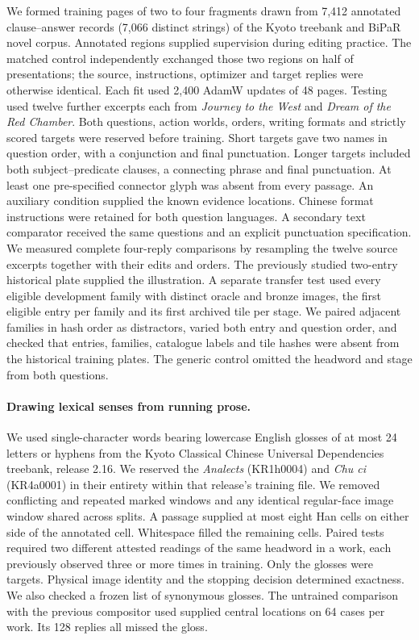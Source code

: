 \documentclass[12pt,a4paper]{article}
\providecommand{\DIFadd}[1]{{\protect\color{blue} \sf #1}} %
\begin{document}
\DIFadd{We formed training pages of two to four fragments drawn from 7,412 annotated clause--answer records (7,066 distinct strings) of the Kyoto treebank and BiPaR novel corpus. Annotated regions supplied supervision during editing practice. The matched control independently exchanged those two regions on half of presentations; the source, instructions, optimizer and target replies were otherwise identical. Each fit used 2,400 AdamW updates of 48 pages. Testing used twelve further excerpts each from \textit{Journey to the West} and \textit{Dream of the Red Chamber}. Both questions, action worlds, orders, writing formats and strictly scored targets were reserved before training. Short targets gave two names in question order, with a conjunction and final punctuation. Longer targets included both subject--predicate clauses, a connecting phrase and final punctuation. At least one pre-specified connector glyph was absent from every passage. An auxiliary condition supplied the known evidence locations. Chinese format instructions were retained for both question languages. A secondary text comparator received the same questions and an explicit punctuation specification. We measured complete four-reply comparisons by resampling the twelve source excerpts together with their edits and orders. The previously studied two-entry historical plate supplied the illustration. A separate transfer test used every eligible development family with distinct oracle and bronze images, the first eligible entry per family and its first archived tile per stage. We paired adjacent families in hash order as distractors, varied both entry and question order, and checked that entries, families, catalogue labels and tile hashes were absent from the historical training plates. The generic control omitted the headword and stage from both questions.
}

\paragraph{\DIFadd{Drawing lexical senses from running prose.}}
\DIFadd{We used single-character words bearing lowercase English glosses of at most 24 letters or hyphens from the Kyoto Classical Chinese Universal Dependencies treebank, release 2.16. We reserved the \textit{Analects} (KR1h0004) and \textit{Chu ci} (KR4a0001) in their entirety within that release's training file. We removed conflicting and repeated marked windows and any identical regular-face image window shared across splits. A passage supplied at most eight Han cells on either side of the annotated cell. Whitespace filled the remaining cells. Paired tests required two different attested readings of the same headword in a work, each previously observed three or more times in training. Only the glosses were targets. Physical image identity and the stopping decision determined exactness. We also checked a frozen list of synonymous glosses. The untrained comparison with the previous compositor used supplied central locations on 64 cases per work. Its 128 replies all missed the gloss.
}
\end{document}
